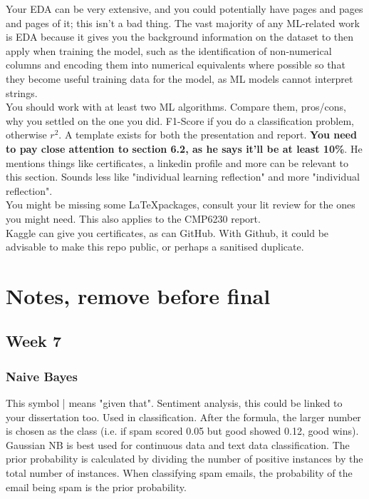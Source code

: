 \documentclass[12pt]{report}
\begin{document}
Your EDA can be very extensive, and you could potentially have pages and pages and pages of it; this isn't a bad thing.
The vast majority of any ML-related work is EDA because it gives you the background information on the dataset to then apply
when training the model, such as the identification of non-numerical columns and encoding them into numerical equivalents where
possible so that they become useful training data for the model, as ML models cannot interpret strings.
\\
\noindent
You should work with at least two ML algorithms. Compare them, pros/cons, why you settled on the one you did.
F1-Score if you do a classification problem, otherwise $r^2$. A template exists for both the presentation and report.
\noindent \textbf{You need to pay close attention to section 6.2, as he says it'll be at least 10\%}.
He mentions things like certificates, a linkedin profile and more can be relevant to this section.
Sounds less like "individual learning reflection" and more "individual reflection".
\\
\noindent 
You might be missing some \LaTeX packages, consult your lit review for the ones you might need.
This also applies to the CMP6230 report.
\\
\noindent
Kaggle can give you certificates, as can GitHub. With Github, it could be 
advisable to make this repo public, or perhaps a sanitised duplicate. 

\chapter{Notes, remove before final}
\section{Week 7}
\subsection{Naive Bayes}
This symbol | means "given that".
Sentiment analysis, this could be linked to your dissertation too.
Used in classification. After the formula, the larger number is chosen as the class (i.e. if spam scored 0.05 but good showed 0.12, good wins).
Gaussian NB is best used for continuous data and text data classification.
The prior probability is calculated by dividing the number of positive instances by the total number of instances.
When classifying spam emails, the probability of the email being spam is the prior probability.
\end{document}
